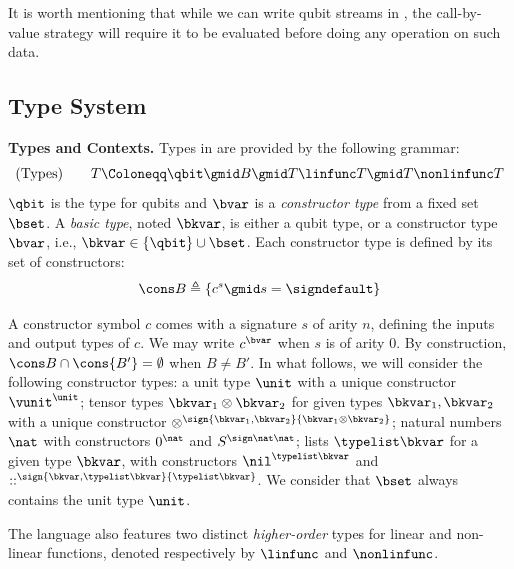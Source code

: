 It is worth mentioning that while we can write qubit streams in \hyrql{}, the
call-by-value strategy will require it to be evaluated before doing any
operation on such data.

\subsection{Type System}
\label{subsec:types}

\textbf{Types and Contexts. }
Types in \hyrql{} are provided by the following grammar:
\[
  \text{(Types)} \qquad T \Coloneqq \qbit \gmid B \gmid T \linfunc T
  \gmid T \nonlinfunc T
\]
$\qbit$ is the type for qubits and $\bvar$ is a \emph{constructor
type} from a fixed set $\bset$.
A \emph{basic type}, noted $\bkvar$, is either a qubit type, or a
constructor type $\bvar$, i.e., $\bkvar \in \{\qbit\} \cup \bset$.
Each constructor type is defined by its set of constructors:
\[
  \cons B \triangleq \{c^s \gmid s = \signdefault\}
\]

A constructor symbol $c$ comes with a signature $s$ of arity $n$, defining the
inputs and output types of $c$. We may write $c^\bvar$ when $s$ is of arity
$0$. By construction, $\cons B \cap \cons{B'} = \emptyset$ when $B \neq B'$.
In what follows, we will consider the
following constructor types: a unit type $\unit$ with a unique constructor
$\vunit^\unit$; tensor types $\bkvar_1 \otimes \bkvar_2$ for given
types $\bkvar_1, \bkvar_2$ with a unique constructor
$\otimes^{\sign{\bkvar_1, \bkvar_2}{\bkvar_1 \otimes \bkvar_2}}$;
natural numbers $\nat$ with constructors $0^\nat$ and 
$S^{\sign \nat \nat}$; lists $\typelist \bkvar$ for a given type $\bkvar$,
with constructors $\nil^{\typelist \bkvar}$ and $::^{\sign {\bkvar, \typelist
\bkvar} {\typelist \bkvar}}$. We consider that $\bset$ always contains the unit
type $\unit$.

The language also features two distinct \emph{higher-order} types
for linear and non-linear functions, denoted respectively
by $\linfunc$ and $\nonlinfunc$.


